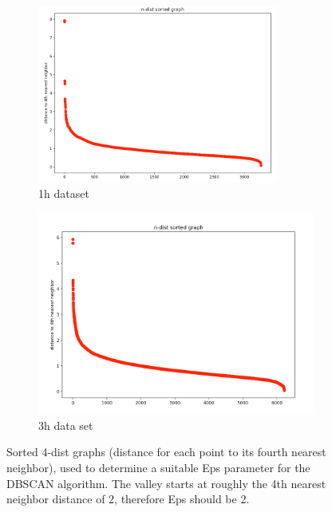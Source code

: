 \begin{figure}
  \centering
  \begin{subfigure}{.5\textwidth}
    \centering
    \includegraphics[width=0.87\textwidth]{./images/kDistGraphDBSCAN1h.png}
  \caption{1h dataset}
  \label{figure:kDistGraphDBSCAN1h}
  \end{subfigure}%
  \begin{subfigure}{.5\textwidth}
    \centering
    \includegraphics[width=1\textwidth]{./images/kDistGraphDBSCAN3h.png}
    \caption{3h data set}
    \label{figure:kDistGraphDBSCAN3h}
  \end{subfigure}
  \caption{Sorted 4-dist graphs (distance for each point to its fourth nearest neighbor), used to determine a suitable Eps parameter for the DBSCAN algorithm. The valley starts at roughly the 4th nearest neighbor distance of 2, therefore Eps should be 2.}
  \label{figure:kDistGraphDBSCAN}
  \end{figure}

